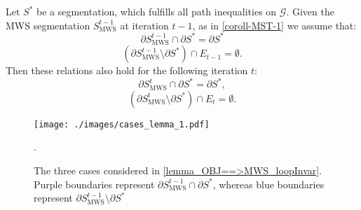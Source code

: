 \begin{lemma}
\label{lemma_OBJ==>MWS_loopInvar}
Let $S^{*}$ be a segmentation, which fulfills all path inequalities on $\mathcal{G}$. 
Given the MWS segmentation $S_{\mathrm{MWS}}^{t-1}$ at iteration $t-1$, as in \autoref{coroll-MST-1} we assume that:
\begin{equation}
\partial S_{\mathrm{MWS}}^{t-1}\cap\partial S^{*}=\partial S^{*} \label{eq:invar-1-prevIter}
\end{equation}
\begin{equation}\left(\partial S_{\mathrm{MWS}}^{t-1}\setminus\partial S^{*}\right)\cap E_{t-1}=\emptyset. \label{eq:invar-2-prevIter}
\end{equation}
Then these relations also hold for the following iteration $t$:
\begin{equation}
\partial S_{\mathrm{MWS}}^{t}\cap\partial S^{*}=\partial S^{*},\label{eq:invar-1}
\end{equation}
\begin{equation}
\left(\partial S_{\mathrm{MWS}}^{t}\setminus\partial S^{*}\right)\cap E_{t}=\emptyset.\label{eq:invar-2}
\end{equation}
\end{lemma}


\begin{figure}[t]
\centering
\texttt{[image: ./images/cases\_lemma\_1.pdf]}
   \caption{The three cases considered in \autoref{lemma_OBJ==>MWS_loopInvar}. Purple boundaries represent ${\partial S_{\mathrm{MWS}}^{t-1}\cap\partial S^{*}}$, whereas blue boundaries represent $\partial S_{\mathrm{MWS}}^{t-1} \setminus \partial S^*$}.
\label{fig:cases_lemma}
\end{figure}

